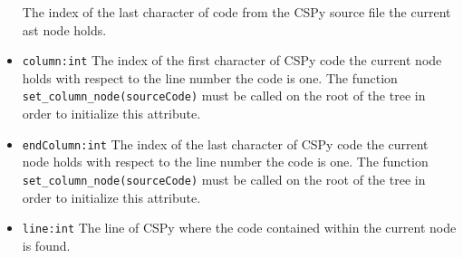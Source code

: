 \documentclass{article}
\begin{document}
\begin{itemize}
The index of the last character of code from the CSPy source file the current ast node holds.

\item \verb|column:int| 
The index of the first character of CSPy code the current node holds with respect to the line number the code is one. The function \verb|set_column_node(sourceCode)| must be called on the root of the tree in order to initialize this attribute.

\item \verb|endColumn:int| 
The index of the last character of CSPy code the current node holds with respect to the line number the code is one. The function \verb|set_column_node(sourceCode)| must be called on the root of the tree in order to initialize this attribute.

\item \verb|line:int| 
The line of CSPy where the code contained within the current node is found.
\end{itemize}
\end{document}
